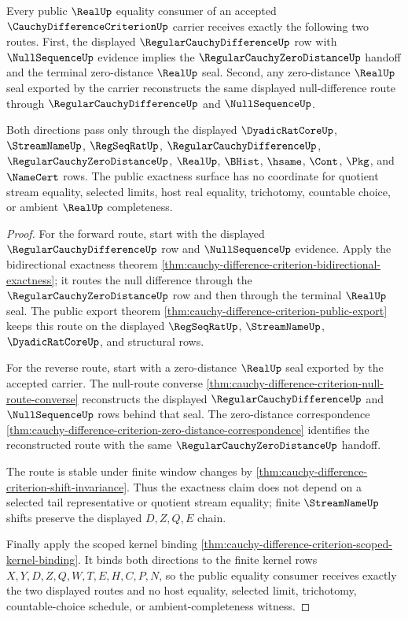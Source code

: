 \begin{theorem}
\label{thm:cauchy-difference-criterion-public-exactness}
Every public $\RealUp$ equality consumer of an accepted $\CauchyDifferenceCriterionUp$ carrier receives exactly the following two routes. First, the displayed $\RegularCauchyDifferenceUp$ row with $\NullSequenceUp$ evidence implies the $\RegularCauchyZeroDistanceUp$ handoff and the terminal zero-distance $\RealUp$ seal. Second, any zero-distance $\RealUp$ seal exported by the carrier reconstructs the same displayed null-difference route through $\RegularCauchyDifferenceUp$ and $\NullSequenceUp$.

Both directions pass only through the displayed $\DyadicRatCoreUp$, $\StreamNameUp$, $\RegSeqRatUp$, $\RegularCauchyDifferenceUp$, $\RegularCauchyZeroDistanceUp$, $\RealUp$, $\BHist$, $\hsame$, $\Cont$, $\Pkg$, and $\NameCert$ rows. The public exactness surface has no coordinate for quotient stream equality, selected limits, host real equality, trichotomy, countable choice, or ambient $\RealUp$ completeness.
\end{theorem}
\begin{proof}
For the forward route, start with the displayed $\RegularCauchyDifferenceUp$ row and $\NullSequenceUp$ evidence. Apply the bidirectional exactness theorem \autoref{thm:cauchy-difference-criterion-bidirectional-exactness}; it routes the null difference through the $\RegularCauchyZeroDistanceUp$ row and then through the terminal $\RealUp$ seal. The public export theorem \autoref{thm:cauchy-difference-criterion-public-export} keeps this route on the displayed $\RegSeqRatUp$, $\StreamNameUp$, $\DyadicRatCoreUp$, and structural rows.

For the reverse route, start with a zero-distance $\RealUp$ seal exported by the accepted carrier. The null-route converse \autoref{thm:cauchy-difference-criterion-null-route-converse} reconstructs the displayed $\RegularCauchyDifferenceUp$ and $\NullSequenceUp$ rows behind that seal. The zero-distance correspondence \autoref{thm:cauchy-difference-criterion-zero-distance-correspondence} identifies the reconstructed route with the same $\RegularCauchyZeroDistanceUp$ handoff.

The route is stable under finite window changes by \autoref{thm:cauchy-difference-criterion-shift-invariance}. Thus the exactness claim does not depend on a selected tail representative or quotient stream equality; finite $\StreamNameUp$ shifts preserve the displayed $D,Z,Q,E$ chain.

Finally apply the scoped kernel binding \autoref{thm:cauchy-difference-criterion-scoped-kernel-binding}. It binds both directions to the finite kernel rows $X,Y,D,Z,Q,W,T,E,H,C,P,N$, so the public equality consumer receives exactly the two displayed routes and no host equality, selected limit, trichotomy, countable-choice schedule, or ambient-completeness witness.
\end{proof}

